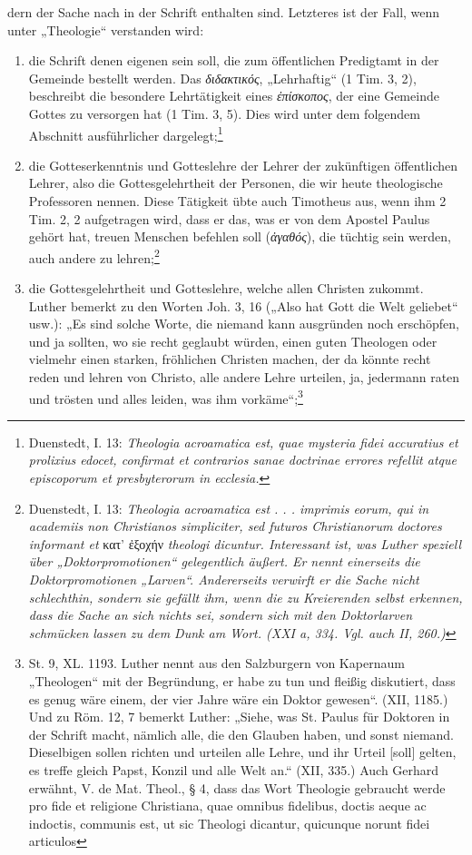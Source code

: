 dern der Sache nach in der Schrift enthalten sind. Letzteres ist der Fall, wenn unter „Theologie“ verstanden wird:
\begin{enumerate}
    \item die Schrift denen eigenen sein soll, die zum öffentlichen Predigtamt in der Gemeinde bestellt werden. Das \emph{διδακτικός}, „Lehrhaftig“ (1 Tim. 3, 2), beschreibt die besondere Lehrtätigkeit eines \emph{ἐπίσκοπος}, der eine Gemeinde Gottes zu versorgen hat (1 Tim. 3, 5). Dies wird unter dem folgendem Abschnitt ausführlicher dargelegt;\footnote{Duenstedt, I. 13: \emph{Theologia acroamatica est, quae mysteria fidei accuratius et prolixius edocet, confirmat et contrarios sanae doctrinae errores refellit atque episcoporum et presbyterorum in ecclesia.} }
    \item die Gotteserkenntnis und Gotteslehre der Lehrer der zukünftigen öffentlichen Lehrer, also die Gottesgelehrtheit der Personen, die wir heute theologische Professoren nennen. Diese Tätigkeit übte auch Timotheus aus, wenn ihm 2 Tim. 2, 2 aufgetragen wird, dass er das, was er von dem Apostel Paulus gehört hat, treuen Menschen befehlen soll (\emph{ἀγαθός}), die tüchtig sein werden, auch andere zu lehren;\footnote{Duenstedt, I. 13: \emph{Theologia acroamatica est . . . imprimis eorum, qui in academiis non Christianos simpliciter, sed futuros Christianorum doctores informant et} κατ’ ἐξοχήν \emph{theologi dicuntur. Interessant ist, was Luther speziell über „Doktorpromotionen“ gelegentlich äußert. Er nennt einerseits die Doktorpromotionen „Larven“. Andererseits verwirft er die Sache nicht schlechthin, sondern sie gefällt ihm, wenn die zu Kreierenden selbst erkennen, dass die Sache an sich nichts sei, sondern sich mit den Doktorlarven schmücken lassen zu dem Dunk am Wort. (XXI a, 334. Vgl. auch II, 260.)} }
    \item die Gottesgelehrtheit und Gotteslehre, welche allen Christen zukommt. Luther bemerkt zu den Worten Joh. 3, 16 („Also hat Gott die Welt geliebet“ usw.): „Es sind solche Worte, die niemand kann ausgründen noch erschöpfen, und ja sollten, wo sie recht geglaubt würden, einen guten Theologen oder vielmehr einen starken, fröhlichen Christen machen, der da könnte recht reden und lehren von Christo, alle andere Lehre urteilen, ja, jedermann raten und trösten und alles leiden, was ihm vorkäme“;\footnote{St. 9, XL. 1193. Luther nennt aus den Salzburgern von Kapernaum „Theologen“ mit der Begründung, er habe zu tun und fleißig diskutiert, dass es genug wäre einem, der vier Jahre wäre ein Doktor gewesen“. (XII, 1185.) Und zu Röm. 12, 7 bemerkt Luther: „Siehe, was St. Paulus für Doktoren in der Schrift macht, nämlich alle, die den Glauben haben, und sonst niemand. Dieselbigen sollen richten und urteilen alle Lehre, und ihr Urteil [soll] gelten, es treffe gleich Papst, Konzil und alle Welt an.“ (XII, 335.) Auch Gerhard erwähnt, V. de Mat. Theol., § 4, dass das Wort Theologie gebraucht werde pro fide et religione Christiana, quae omnibus fidelibus, doctis aeque ac indoctis, communis est, ut sic Theologi dicantur, quicunque norunt fidei articulos}
\end{enumerate}
